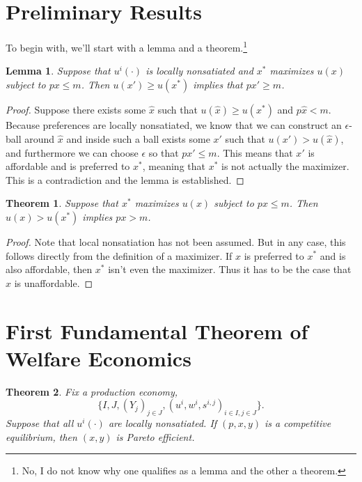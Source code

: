 \documentclass[12pt]{article}
\newtheorem*{lemma}{Lemma}
\newtheorem*{theorem*}{Theorem}
\theoremstyle{definition}
\begin{document}
\maketitle
\onehalfspace

\section*{Preliminary Results}

 To begin with, we'll start with a lemma and a theorem.\footnote{No, I do not know why one qualifies as a lemma and the other a theorem.}

\begin{lemma}
Suppose that $u^i(\cdot)$ is locally nonsatiated and $x^*$ maximizes $u(x)$ subject to $px \leq m$. Then $u(x') \geq u(x^*)$ implies that $px' \geq m$. 
\end{lemma}
\begin{proof}
	Suppose there exists some $\hat{x}$ such that $u(\hat{x}) \geq u(x^*)$ and $p\hat{x} < m$. Because preferences are locally nonsatiated, we know that we can construct an $\epsilon$-ball around $\hat{x}$ and inside such a ball exists some $x'$  such that $u(x') > u(\hat{x})$, and furthermore we can choose $\epsilon$ so that $p x' \leq m$. This means that $x'$ is affordable and is preferred to $x^*$, meaning that $x^*$ is not actually the maximizer. This is a contradiction and the lemma is established. 
\end{proof}


\begin{theorem*}
	Suppose that $x^*$ maximizes $u(x)$ subject to $px \leq m$. Then $u(x) > u(x^*)$ implies $px > m$. 
\end{theorem*}
\begin{proof}
	Note that local nonsatiation has not been assumed. But in any case, this follows directly from the definition of a maximizer. If $x$ is preferred to $x^*$ and is also affordable, then $x^*$ isn't even the maximizer. Thus it has to be the case that $x$ is unaffordable. 
\end{proof}


\section*{First Fundamental Theorem of Welfare Economics}

\begin{theorem*}
	Fix a production economy, 
		\[			\{ I, J, (Y_j)_{j\in J}, (u^i, w^i, s^{i,j})_{i \in I, j \in J}\}. 	\]
	Suppose that all $u^i(\cdot)$ are locally nonsatiated. If $(p,x,y)$ is a competitive equilibrium, then $(x,y)$ is Pareto efficient.
\end{theorem*}
\end{document}
